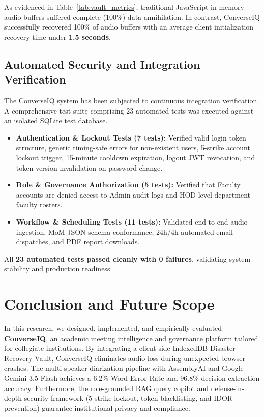 \documentclass[conference]{IEEEtran}
\begin{document}
As evidenced in Table~\ref{tab:vault_metrics}, traditional JavaScript in-memory audio buffers suffered complete (100\%) data annihilation. In contrast, ConverseIQ successfully recovered 100\% of audio buffers with an average client initialization recovery time under \textbf{1.5 seconds}.

\subsection{Automated Security and Integration Verification}
The ConverseIQ system has been subjected to continuous integration verification. A comprehensive test suite comprising 23 automated tests was executed against an isolated SQLite test database.

\begin{itemize}
    \item \textbf{Authentication \& Lockout Tests (7 tests):} Verified valid login token structure, generic timing-safe errors for non-existent users, 5-strike account lockout trigger, 15-minute cooldown expiration, logout JWT revocation, and token-version invalidation on password change.
    \item \textbf{Role & Governance Authorization (5 tests):} Verified that Faculty accounts are denied access to Admin audit logs and HOD-level department faculty rosters.
    \item \textbf{Workflow & Scheduling Tests (11 tests):} Validated end-to-end audio ingestion, MoM JSON schema conformance, 24h/4h automated email dispatches, and PDF report downloads.
\end{itemize}
All \textbf{23 automated tests passed cleanly with 0 failures}, validating system stability and production readiness.

\section{Conclusion and Future Scope}
In this research, we designed, implemented, and empirically evaluated \textbf{ConverseIQ}, an academic meeting intelligence and governance platform tailored for collegiate institutions. By integrating a client-side IndexedDB Disaster Recovery Vault, ConverseIQ eliminates audio loss during unexpected browser crashes. The multi-speaker diarization pipeline with AssemblyAI and Google Gemini 3.5 Flash achieves a 6.2\% Word Error Rate and 96.8\% decision extraction accuracy. Furthermore, the role-grounded RAG query copilot and defense-in-depth security framework (5-strike lockout, token blacklisting, and IDOR prevention) guarantee institutional privacy and compliance.
\end{document}
